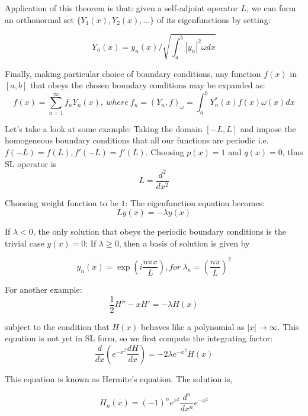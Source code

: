 \documentclass{article}
\theoremstyle{definition}
\begin{document}
Application of this theorem is that: given a self-adjoint operator $L$, we can form an orthonormal set $\{Y_1(x),Y_2(x),\ldots \}$ of its eigenfunctions by setting:

\begin{equation}
Y_n(x)=y_n(x)/\sqrt{\int_a^b |y_n|^2\omega dx}
\end{equation}

Finally, making particular choice of boundary conditions, any function $f(x)$ in $[a,b]$ that obeys the chosen boundary conditions may be expanded as:
\begin{equation}
f(x)=\sum_{n=1}^\infty f_n Y_n(x), \ where \ f_n=(Y_n,f)_\omega =\int_a^b Y_n^*(x)f(x)\omega (x)dx
\end{equation}

Let's take a look at some example:
Taking the domain $[-L,L]$ and impose the homogeneous boundary conditions that all our functions are periodic i.e. $f(-L)=f(L),f'(-L)=f'(L)$. Choosing $p(x)=1$ and $q(x)=0$, thus SL operator is
\begin{equation}
L=\frac{d^2}{dx^2}
\end{equation}

Choosing weight function to be $1$:
The eigenfunction equation becomes:
\begin{equation}
Ly(x)=-\lambda y(x)
\end{equation}

If $\lambda <0$, the only solution that obeys the periodic boundary conditions is the trivial case $y(x)=0$; If $\lambda \geq 0$, then a basis of solution is given by

\begin{equation}
y_n(x)=\exp(i \frac{n \pi x}{L}), for \ \lambda_n=\left(\frac{n\pi}{L}\right)^2
\end{equation}

For another example:
\begin{equation}
\frac{1}{2}H''-xH'=-\lambda H(x)
\end{equation}

subject to the condition that $H(x)$ behaves like a polynomial as $|x| \to \infty$. This equation is not yet in SL form, so we first compute the integrating factor:
\begin{equation}
\frac{d}{dx}\left(e^{-x^2}\frac{dH}{dx}\right)=-2\lambda e^{-x^2}H(x)
\end{equation}


This equation is known as Hermite's equation. The solution is,

\begin{equation}
H_n(x)=(-1)^ne^{x^2}\frac{d^n}{dx^n}e^{-x^2}
\end{equation}
\end{document}
